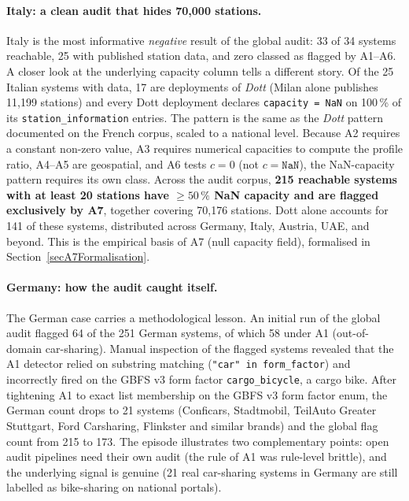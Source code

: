 \documentclass[11pt,a4paper]{article}
\begin{document}
\paragraph{Italy: a clean audit that hides 70{,}000 stations.}
Italy is the most informative \emph{negative} result of the global
audit: 33 of 34 systems reachable, 25 with published station data,
and zero classed as flagged by A1--A6. A closer look at the
underlying capacity column tells a different story. Of the 25
Italian systems with data, 17 are deployments of \emph{Dott} (Milan
alone publishes 11{,}199 stations) and every Dott deployment
declares \texttt{capacity = NaN} on 100\,\% of its
\texttt{station\_information} entries. The pattern is the same as
the \emph{Dott} pattern documented on the French corpus, scaled to
a national level. Because A2 requires a constant non-zero value,
A3 requires numerical capacities to compute the profile ratio,
A4--A5 are geospatial, and A6 tests $c = 0$ (not
$c = \texttt{NaN}$), the NaN-capacity pattern requires its own
class. Across the audit corpus, \textbf{215 reachable systems
with at least 20 stations have $\geq 50\,\%$ NaN capacity and are
flagged exclusively by A7}, together covering 70{,}176 stations.
Dott alone accounts for 141 of these systems, distributed across
Germany, Italy, Austria, UAE, and beyond. This is the empirical
basis of A7 (null capacity field), formalised in
Section~\ref{secA7Formalisation}.

\paragraph{Germany: how the audit caught itself.}
The German case carries a methodological lesson. An initial run of
the global audit flagged 64 of the 251 German systems, of which 58
under A1 (out-of-domain car-sharing). Manual inspection of the
flagged systems revealed that the A1 detector relied on substring
matching (\texttt{"car" in form\_factor}) and incorrectly fired on
the GBFS v3 form factor \texttt{cargo\_bicycle}, a cargo bike. After
tightening A1 to exact list membership on the GBFS v3 form factor
enum, the German count drops to 21 systems (Conficars, Stadtmobil,
TeilAuto Greater Stuttgart, Ford Carsharing, Flinkster and similar
brands) and the global flag count from 215 to 173. The episode
illustrates two complementary points: open audit pipelines need
their own audit (the rule of A1 was rule-level brittle), and the
underlying signal is genuine (21 real car-sharing systems in
Germany are still labelled as bike-sharing on national portals).
\end{document}
